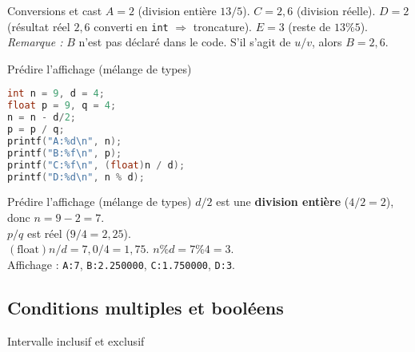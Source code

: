 \begin{UPSTIprofOnlyEnv}
  \begin{UPSTIcorrectionP}{Conversions et cast}
    $A=\boxed{2}$ (division entière $13/5$).  
    $C=\boxed{2{,}6}$ (division réelle).  
    $D=\boxed{2}$ (résultat réel $2{,}6$ converti en \texttt{int} $\Rightarrow$ troncature).  
    $E=\boxed{3}$ (reste de $13\%5$).  
    \textit{Remarque :} $B$ n'est pas déclaré dans le code. S’il s’agit de $u/v$, alors $B=\boxed{2{,}6}$.
  \end{UPSTIcorrectionP}
\end{UPSTIprofOnlyEnv}

\begin{UPSTIexercice}{Prédire l'affichage (mélange de types)}
\begin{lstlisting}[language=C]
int n = 9, d = 4;
float p = 9, q = 4;
n = n - d/2;
p = p / q;
printf("A:%d\n", n);
printf("B:%f\n", p);
printf("C:%f\n", (float)n / d);
printf("D:%d\n", n % d);
\end{lstlisting}
\end{UPSTIexercice}

\begin{UPSTIprofOnlyEnv}
  \begin{UPSTIcorrectionP}{Prédire l'affichage (mélange de types)}
    $d/2$ est une \textbf{division entière} ($4/2=2$), donc $n=9-2=\boxed{7}$.  \\
    $p/q$ est réel ($9/4=\boxed{2{,}25}$).  \\
    $(\text{float})n/d = 7{,}0/4 = \boxed{1{,}75}$.  
    $n\%d = 7\%4 = \boxed{3}$.  \\
    Affichage : \texttt{A:7}, \texttt{B:2.250000}, \texttt{C:1.750000}, \texttt{D:3}.
  \end{UPSTIcorrectionP}
\end{UPSTIprofOnlyEnv}

\subsection{Conditions multiples et booléens}

\begin{UPSTIexercice}{Intervalle inclusif et exclusif}
\end{UPSTIexercice}

